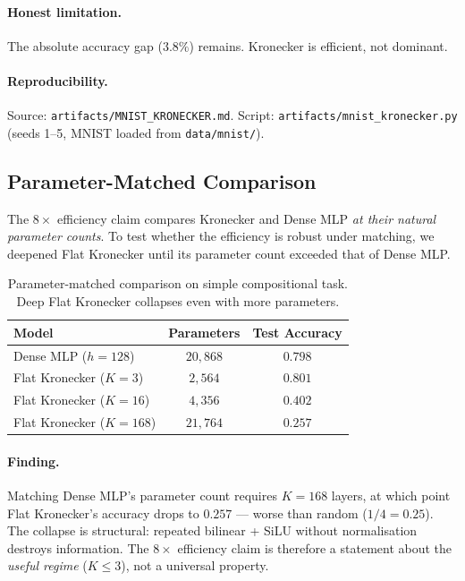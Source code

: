 \documentclass[11pt,a4paper]{article}
\begin{document}
\paragraph{Honest limitation.}
The absolute accuracy gap ($3.8\%$) remains. Kronecker is efficient,
not dominant.

\paragraph{Reproducibility.}
Source: \texttt{artifacts/MNIST\_KRONECKER.md}.
Script: \texttt{artifacts/mnist\_kronecker.py} (seeds 1--5,
MNIST loaded from \texttt{data/mnist/}).

\subsection{Parameter-Matched Comparison}
\label{sec:param-matched}

The $8\times$ efficiency claim compares Kronecker and Dense MLP
\emph{at their natural parameter counts}. To test whether the
efficiency is robust under matching, we deepened Flat Kronecker
until its parameter count exceeded that of Dense MLP.

\begin{table}[h]
\centering
\caption{Parameter-matched comparison on simple compositional task.
Deep Flat Kronecker collapses even with more parameters.}
\label{tab:param-matched}
\small
\begin{tabular}{lcc}
\toprule
Model & Parameters & Test Accuracy \\
\midrule
Dense MLP ($h=128$)          & $20{,}868$ & $0.798$ \\
Flat Kronecker ($K=3$)       & $2{,}564$  & $0.801$ \\
Flat Kronecker ($K=16$)      & $4{,}356$  & $0.402$ \\
Flat Kronecker ($K=168$)     & $21{,}764$ & $0.257$ \\
\bottomrule
\end{tabular}
\end{table}

\paragraph{Finding.}
Matching Dense MLP's parameter count requires $K=168$ layers, at
which point Flat Kronecker's accuracy drops to $0.257$ --- worse
than random ($1/4 = 0.25$). The collapse is structural: repeated
bilinear + SiLU without normalisation destroys information. The
$8\times$ efficiency claim is therefore a statement about the
\emph{useful regime} ($K \leq 3$), not a universal property.
\end{document}
